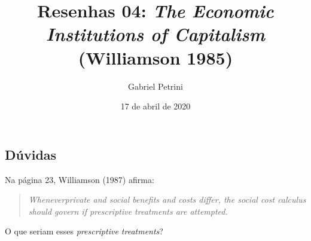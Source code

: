 \documentclass[9pt,twocolumn,twoside,lineno]{style}
\title{Resenhas 04: \textit{The Economic Institutions of Capitalism} (Williamson 1985)}
\date{17 de abril de  2020}
\author[$\ddagger$]{Gabriel Petrini}
\affil[$\ddagger$]{Doutorando no instituto de Economia da Unicamp}
\begin{document}
\maketitle\articletypemark
\marginmark
\thispagestyle{firststyle}






\begin{sigstatement}
	\sffamily
	{%
		\begin{mdframed}[style=stylesigstyle]%
			\section*{Dúvidas}%
			Na página 23, Williamson (1987) afirma:
			\begin{quotation}
				\textit{Wheneverprivate and social benefits and costs differ, the social cost
					calculus should govern if prescriptive treatments are attempted.}
			\end{quotation}
			O que seriam esses \textit{prescriptive treatments}? 
			
	\end{mdframed}}
\end{sigstatement}
	
\end{document}
